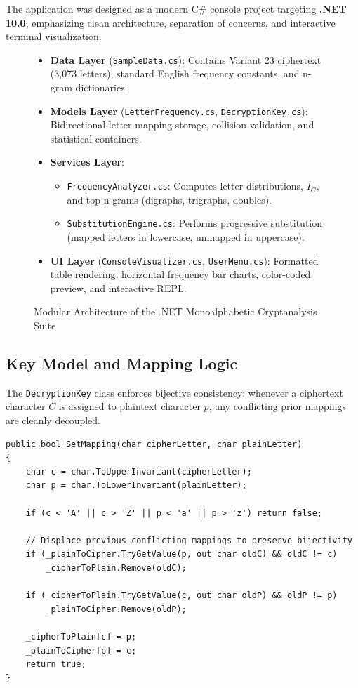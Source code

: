 \documentclass[12pt,a4paper]{article}
\begin{document}
The application was designed as a modern C\# console project targeting \textbf{.NET 10.0}, emphasizing clean architecture, separation of concerns, and interactive terminal visualization.

\begin{figure}[h!]
\centering
\begin{tcolorbox}[colback=codebg,colframe=codeframe,arc=2mm,title=\textbf{Application Component Structure}]
\small
\begin{itemize}
    \item \textbf{Data Layer} (\texttt{SampleData.cs}): Contains Variant 23 ciphertext (3,073 letters), standard English frequency constants, and n-gram dictionaries.
    \item \textbf{Models Layer} (\texttt{LetterFrequency.cs}, \texttt{DecryptionKey.cs}): Bidirectional letter mapping storage, collision validation, and statistical containers.
    \item \textbf{Services Layer}:
    \begin{itemize}
        \item \texttt{FrequencyAnalyzer.cs}: Computes letter distributions, $I_C$, and top n-grams (digraphs, trigraphs, doubles).
        \item \texttt{SubstitutionEngine.cs}: Performs progressive substitution (mapped letters in lowercase, unmapped in uppercase).
    \end{itemize}
    \item \textbf{UI Layer} (\texttt{ConsoleVisualizer.cs}, \texttt{UserMenu.cs}): Formatted table rendering, horizontal frequency bar charts, color-coded preview, and interactive REPL.
\end{itemize}
\end{tcolorbox}
\caption{Modular Architecture of the .NET Monoalphabetic Cryptanalysis Suite}
\label{fig:arch}
\end{figure}

\subsection{Key Model and Mapping Logic}
The \texttt{DecryptionKey} class enforces bijective consistency: whenever a ciphertext character $C$ is assigned to plaintext character $p$, any conflicting prior mappings are cleanly decoupled.

\begin{lstlisting}[caption={DecryptionKey Implementation (Excerpt)}]
public bool SetMapping(char cipherLetter, char plainLetter)
{
    char c = char.ToUpperInvariant(cipherLetter);
    char p = char.ToLowerInvariant(plainLetter);

    if (c < 'A' || c > 'Z' || p < 'a' || p > 'z') return false;

    // Displace previous conflicting mappings to preserve bijectivity
    if (_plainToCipher.TryGetValue(p, out char oldC) && oldC != c)
        _cipherToPlain.Remove(oldC);

    if (_cipherToPlain.TryGetValue(c, out char oldP) && oldP != p)
        _plainToCipher.Remove(oldP);

    _cipherToPlain[c] = p;
    _plainToCipher[p] = c;
    return true;
}
\end{lstlisting}
\end{document}
